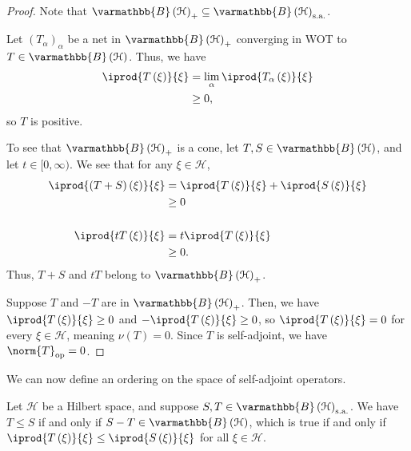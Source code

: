 \documentclass[10pt]{mypackage}
\renewcommand*{\mathbb}[1]{\varmathbb{#1}}
\newcommand{\sa}{\text{s.a.}}
\newcommand{\B}{\mathbb{B}}
\begin{document}
\begin{proof}
  Note that $\B\left(\mathcal{H}\right)_{+}\subseteq \B\left(\mathcal{H}\right)_{\sa}$.\newline

  Let $\left(T_{\alpha}\right)_{\alpha}$ be a net in $\B\left(\mathcal{H}\right)_{+}$ converging in WOT to $T\in \B\left(\mathcal{H}\right)$. Thus, we have
  \begin{align*}
    \iprod{T\left(\xi\right)}{\xi} &= \lim_{\alpha} \iprod{T_{\alpha}\left(\xi\right)}{\xi}\\
                                   &\geq 0,
  \end{align*}
  so $T$ is positive.\newline

  To see that $\B\left(\mathcal{H}\right)_{+}$ is a cone, let $T,S\in \B\left(\mathcal{H}\right)$, and let $t\in [0,\infty)$. We see that for any $\xi\in \mathcal{H}$,
  \begin{align*}
    \iprod{\left(T+S\right)\left(\xi\right)}{\xi} &= \iprod{T\left(\xi\right)}{\xi} + \iprod{S\left(\xi\right)}{\xi}\\
                                                  &\geq 0\\
                                                  \\
    \iprod{tT\left(\xi\right)}{\xi} &= t \iprod{T\left(\xi\right)}{\xi}\\
                                    &\geq 0.
  \end{align*}
  Thus, $T+S$ and $tT$ belong to $\B\left(\mathcal{H}\right)_{+}$.\newline

  Suppose $T$ and $-T$ are in $\B\left(\mathcal{H}\right)_{+}$. Then, we have $ \iprod{T\left(\xi\right)}{\xi} \geq 0 $ and $ - \iprod{T\left(\xi\right)}{\xi} \geq 0 $, so $ \iprod{T\left(\xi\right)}{\xi} = 0 $ for every $\xi \in \mathcal{H}$, meaning $\nu\left(T\right) = 0$. Since $T$ is self-adjoint, we have $\norm{T}_{\text{op}} = 0$.
\end{proof}
We can now define an ordering on the space of self-adjoint operators.
\begin{definition}
  Let $\mathcal{H}$ be a Hilbert space, and suppose $S,T\in \B\left(\mathcal{H}\right)_{\sa}$. We have $T\leq S$ if and only if $S-T\in \B\left(\mathcal{H}\right)$, which is true if and only if $ \iprod{T\left(\xi\right)}{\xi} \leq \iprod{S\left(\xi\right)}{\xi} $ for all $\xi \in \mathcal{H}$.
\end{definition}
\end{document}
